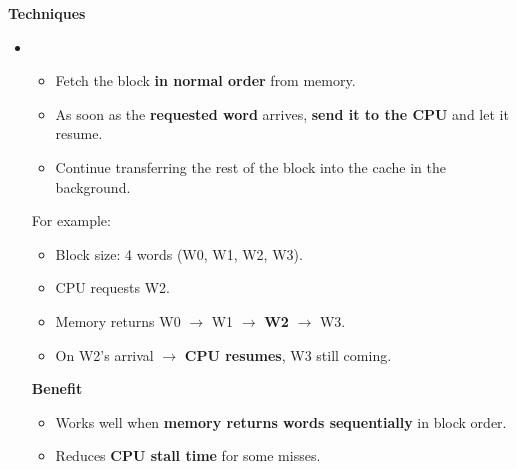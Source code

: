 \highspace
\begin{flushleft}
    \textcolor{Green3}{ \textbf{Techniques}}
\end{flushleft}
\begin{itemize}
    \item {}
    \begin{itemize}
        \item Fetch the block \textbf{in normal order} from memory.
        \item As soon as the \textbf{requested word} arrives, \textbf{send it to the CPU} and let it resume.
        \item Continue transferring the rest of the block into the cache in the background.
    \end{itemize}
    For example:
    \begin{itemize}
        \item Block size: 4 words (W0, W1, W2, W3).
        \item CPU requests W2.
        \item Memory returns W0 $\rightarrow$ W1 $\rightarrow$ \textbf{W2} $\rightarrow$ W3.
        \item On W2's arrival $\rightarrow$ \textbf{CPU resumes}, W3 still coming.
    \end{itemize}
    \begin{flushleft}
        \textcolor{Green3}{ \textbf{Benefit}}
    \end{flushleft}
    \begin{itemize}
        \item[\textcolor{Green3}{\faIcon{check}}] Works well when \textbf{memory returns words sequentially} in block order.
        \item[\textcolor{Green3}{\faIcon{check}}] Reduces \textbf{CPU stall time} for some misses.
    \end{itemize}



\end{itemize}
